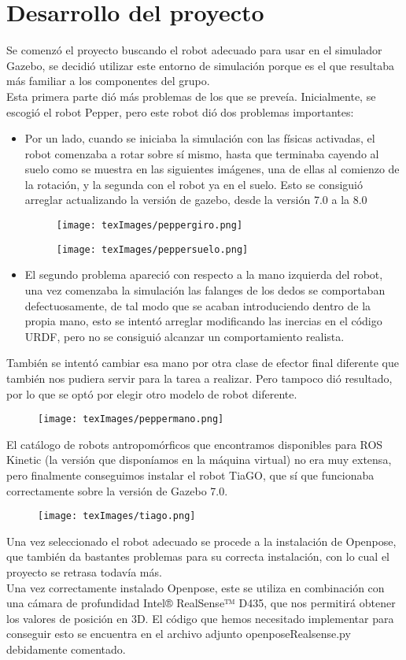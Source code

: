 \usepackage{graphicx}
\section{Desarrollo del proyecto}
Se comenzó el proyecto buscando el robot adecuado para usar en el simulador Gazebo, se decidió utilizar este entorno de simulación porque es el que resultaba más familiar a los componentes del grupo.\\
Esta primera parte dió más problemas de los que se preveía. 
Inicialmente, se escogió el robot Pepper, pero este robot dió dos problemas importantes:
\begin{itemize}
  \item Por un lado, cuando se iniciaba la simulación con las físicas activadas, el robot comenzaba a rotar sobre sí mismo, hasta que terminaba cayendo al suelo como se muestra en las siguientes imágenes, una de ellas al comienzo de la rotación, y la segunda con el robot ya en el suelo. Esto se consiguió arreglar actualizando la versión de gazebo, desde la versión 7.0 a la 8.0
\begin{figure}
  \texttt{[image: texImages/peppergiro.png]}
\end{figure}
\begin{figure}
  \texttt{[image: texImages/peppersuelo.png]}
\end{figure}
\item El segundo problema apareció con respecto a la mano izquierda del robot, una vez comenzaba la simulación las falanges de los dedos se comportaban defectuosamente, de tal modo que se acaban introduciendo dentro de la propia mano, esto se intentó arreglar modificando las inercias en el código URDF, pero no se consiguió alcanzar un comportamiento realista.\\
\end{itemize}
También se intentó cambiar esa mano por otra clase de efector final diferente que también nos pudiera servir para la tarea a realizar. Pero tampoco dió resultado, por lo que se optó por elegir otro modelo de robot diferente.\\
\begin{figure}
  \texttt{[image: texImages/peppermano.png]}
\end{figure}
El catálogo de robots antropomórficos que encontramos disponibles para ROS Kinetic (la versión que disponíamos en la máquina virtual) no era muy extensa, pero finalmente conseguimos instalar el robot TiaGO, que sí que funcionaba correctamente sobre la versión de Gazebo 7.0.\\
\begin{figure}
  \texttt{[image: texImages/tiago.png]}
\end{figure}
Una vez seleccionado el robot adecuado se procede a la instalación de Openpose, que también da bastantes problemas para su correcta instalación, con lo cual el proyecto se retrasa todavía más.\\
Una vez correctamente instalado Openpose, este se utiliza en combinación con una cámara de profundidad Intel® RealSense™ D435, que nos permitirá obtener los valores de posición en 3D. El código que hemos necesitado implementar para conseguir esto se encuentra en el archivo adjunto openposeRealsense.py debidamente comentado.\\
